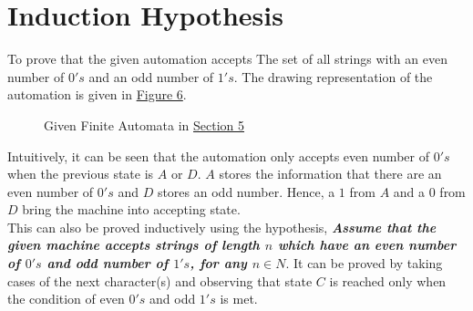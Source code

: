\documentclass[11pt,letterpaper]{article}
\begin{document}
\section{Induction Hypothesis}
\label{sec:s5}
To prove that the given automation accepts The set of all strings with an even number of $0's$ and an odd number of $1's$. The drawing representation of the automation is given in \hyperref[fig:fsm6]{Figure 6}.
\begin{figure}[!ht]
\centering
{}
\caption{Given Finite Automata in \hyperref[sec:s5]{Section 5}}
\label{fig:fsm6}
\end{figure}

Intuitively, it can be seen that the automation only accepts even number of $0's$ when the previous state is $A$ or $D$. $A$ stores the information that there are an even number of $0's$ and $D$ stores an odd number. Hence, a $1$ from $A$ and a $0$ from $D$ bring the machine into accepting state. \\
This can also be proved inductively using the hypothesis, \textit{\textbf{Assume that the given machine accepts strings of length $n$ which have an even number of $0's$ and odd number of $1's$, for any $n \in N$}}. It can be proved by taking cases of the next character(s) and observing that state $C$ is reached only when the condition of even $0's$ and odd $1's$ is met.
\end{document}
